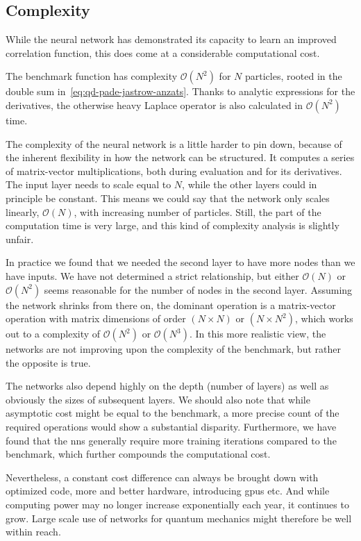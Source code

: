 \documentclass[Thesis.tex]{subfiles}
\begin{document}
\subsection{Complexity}

While the neural network has demonstrated its capacity to learn an improved
correlation function, this does come at a considerable computational cost.

The benchmark function has complexity $\mathcal{O}(N^2)$ for $N$ particles,
rooted in the double sum in~\cref{eq:qd-pade-jastrow-anzats}. Thanks to
analytic expressions for the derivatives, the otherwise heavy Laplace operator
is also calculated in $\mathcal{O}(N^2)$ time.

The complexity of the neural network is a little harder to pin down, because of
the inherent flexibility in how the network can be structured.
It computes a series of matrix-vector multiplications, both during
evaluation and for its derivatives. The input layer needs to scale equal to $N$,
while the other layers could in principle be constant. This means we could say
that the network only scales linearly, $\mathcal{O}(N)$, with increasing number
of particles. Still, the  part of the computation time is very
large, and this kind of complexity analysis is slightly unfair.

In practice we found that we needed the second layer to have more nodes than we
have inputs. We have not determined a strict relationship, but either
$\mathcal{O}(N)$ or $\mathcal{O}(N^2)$ seems reasonable for the number of nodes
in the second layer. Assuming the network shrinks from there on, the dominant
operation is a matrix-vector operation with matrix dimensions of order $(N\times
N)$ or $(N\times N^2)$, which works out to a complexity of $\mathcal{O}(N^2)$ or
$\mathcal{O}(N^3)$. In this more realistic view, the networks are not improving
upon the complexity of the benchmark, but rather the opposite is true.

The networks also depend highly on the depth (number of layers) as
well as obviously the sizes of subsequent layers. We should also note that while
asymptotic cost might be equal to the benchmark, a more precise count of the
required operations would show a substantial disparity. Furthermore, we have
found that the \glspl{nn} generally require more training iterations compared to
the benchmark, which further compounds the computational cost.

Nevertheless, a constant cost difference can always be brought down with
optimized code, more and better hardware, introducing \glspl{gpu} etc. And while
computing power may no longer increase exponentially each year, it continues to
grow. Large scale use of networks for quantum mechanics might therefore be well
within reach.
\end{document}
